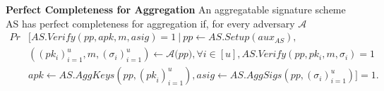 
\vspace{-0.02in}
\noindent \textbf{Perfect Completeness for Aggregation} An aggregatable 
signature scheme AS
has perfect completeness for aggregation if, for every adversary $\mathcal{A}$
\begin{align*}
\mathit{Pr} & [\mathit{AS.Verify}(\mathit{pp}, \mathit{apk}, m, \mathit{asig}) = 1 \ | \ \mathit{pp} \leftarrow \mathit{AS.Setup}(\mathit{aux_{\mathit{AS}}}),  \\     
                  &((\mathit{pk_i})_{i=1}^u, m, (\sigma_i)_{i=1}^{u}) \leftarrow \mathcal{A}(\mathit{\mathit{pp})}, \forall i \in [u], \mathit{AS.Verify}(\mathit{pp}, \mathit{pk_i}, m, \sigma_i) = 1 \\ 
                  &\mathit{apk} \leftarrow \mathit{AS.AggKeys}(\mathit{pp},(\mathit{pk}_{i})_{i=1}^{u}), \mathit{asig} \leftarrow \mathit{AS.AggSigs}(\mathit{pp}, (\sigma_i)_{i=1}^u)] = 1.
\end{align*}

